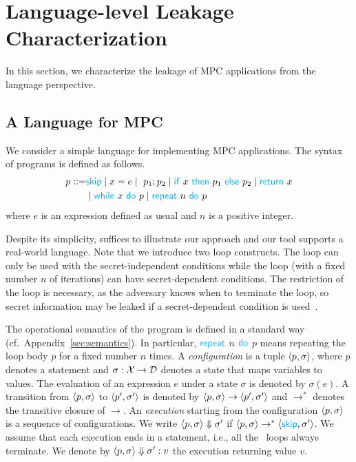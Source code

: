 \section{Language-level Leakage Characterization}\label{sec:leakagePL}
In this section, we characterize the leakage of MPC applications from the language perspective.

\subsection{A Language for MPC}
We consider a simple language {\LANG} for implementing MPC applications.
The syntax of {\LANG} programs is defined as follows. %
\begin{align*}
  p  ::=  & {\Pskip} \mid x = e  \mid \ p_1; p_2 \mid   {\Pif} \ x \ {\Pthen} \  p_1 \ {\Pelse} \ p_2 \mid {\Preturn} \ x \\
    & \mid    {\Pwhile} \ x \ \Pdo \ p  \mid {\Prepeat} \ n \ \Pdo \ p
\end{align*}
where $e$ is an expression defined as usual and $n$ is a positive integer.

Despite its simplicity, {\LANG} suffices to illustrate our approach %
and our tool supports a real-world language. %
Note that we introduce two loop constructs.
The {\Pwhile} loop can only be used with the secret-independent conditions
while the {\Prepeat} loop (with a fixed number $n$ of iterations) can have secret-dependent conditions.
The restriction of the {\Pwhile} loop
is necessary, as %
the adversary knows when to terminate the loop, so
secret information may be leaked if a secret-dependent condition is used~\cite{ZahurE15}.

The operational semantics of the {\LANG} program is defined in a standard way %
(cf.\  Appendix~\ref{sec:semantics}). %
In particular, ${{\textcolor{cyan}{\sf repeat}}}$ $n$ ${\textcolor{cyan}{\sf do}}$ $p$ means repeating the loop body $p$ for a fixed number $n$ times.
A \emph{configuration} is a tuple $\langle{p, \sigma}\rangle$, where $p$ denotes a statement and $\sigma:\mathcal{X}\rightarrow\mathcal{D}$ denotes a state that maps variables to values.
The evaluation of an expression $e$ under a state $\sigma$ is denoted by $\sigma(e)$.
%
A transition from  $\langle{p, \sigma}\rangle$ to $\langle{p', \sigma'}\rangle$
is denoted by $\langle{p, \sigma}\rangle\rightarrow \langle{p', \sigma'}\rangle$ and $\rightarrow^*$ denotes the transitive closure of $\rightarrow$.
%
An \emph{execution} starting from the configuration $\langle{p, \sigma}\rangle$ is a sequence of configurations. We write $\langle{p, \sigma}\rangle\Downarrow \sigma'$
if $\langle{p, \sigma}\rangle\rightarrow^* \langle{{{\textcolor{cyan}{\sf skip}}}, \sigma'}\rangle$.
We assume that each execution ends in a {\Preturn} statement, i.e.,
all the {\Pwhile}\ loops always terminate.
We denote by $\langle{p, \sigma}\rangle\Downarrow \sigma':v$
the execution returning value $v$.



